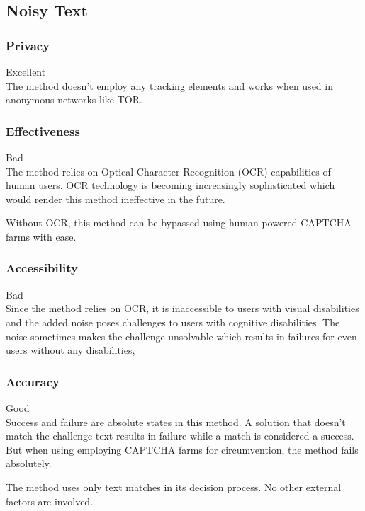 \subsection{Noisy Text}

\subsubsection{Privacy}
Excellent\\
The method doesn't employ any tracking elements and works when used in anonymous
networks like TOR\@.

\subsubsection{Effectiveness}
Bad\\
The method relies on Optical Character Recognition (OCR) capabilities of human
users. OCR technology is becoming increasingly sophisticated which would render
this method ineffective in the future.

Without OCR, this method can be bypassed using human-powered CAPTCHA farms with
ease.
\subsubsection{Accessibility}
Bad\\
Since the method relies on OCR, it is inaccessible to users with visual
disabilities and the added noise poses challenges to users with cognitive
disabilities. The noise sometimes makes the challenge unsolvable which results
in failures for even users without any disabilities,
\subsubsection{Accuracy}
Good\\
Success and failure are absolute states in this method. A solution that doesn't
match the challenge text results in failure while a match is considered a
success. But when using employing CAPTCHA farms for circumvention, the method
fails absolutely.

The method uses only text matches in its decision process. No other
external factors are involved.
